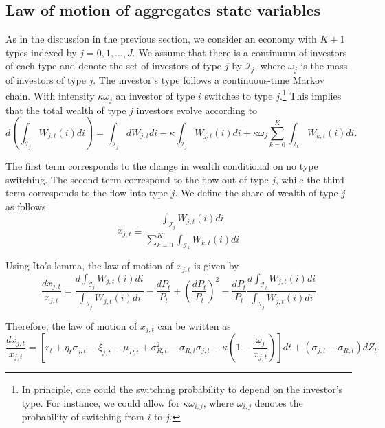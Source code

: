 \documentclass[11pt,english]{article}
\begin{document}
\subsection{Law of motion of aggregates state variables}

As in the discussion in the previous section, we consider an economy with $K+1$ types indexed by $j = 0, 1, \ldots, J$. 
We assume that there is a continuum of investors of each type and denote the set of investors of type $j$ by $\mathcal{I}_j$, where $\omega_j$ is the mass of investors of type $j$. 
The investor's type follows a continuous-time Markov chain. With intensity $\kappa \omega_{j}$ an investor of type $i$ switches to type $j$.\footnote{In principle, one could the switching probability to depend on the investor's type. For instance, we could allow for $\kappa \omega_{i,j}$, where $\omega_{i,j}$ denotes the probability of switching from $i$ to $j$.} This implies that the total wealth of type $j$ investors evolve according to
\begin{equation*}
    d \left(\int_{\mathcal{I}_j} W_{j,t}(i)di \right) =   \int_{\mathcal{I}_j} d W_{j,t} di - \kappa \int_{\mathcal{I}_j} W_{j,t}(i)di +\kappa \omega_j \sum_{k=0}^K  \int_{\mathcal{I}_k} W_{k,t}(i)di.
\end{equation*}

The first term corresponds to the change in wealth conditional on no type switching. The second term correspond to the flow out of type $j$, while the third term corresponds to the flow into type $j$. 
We define the share of wealth of type $j$ as follows
\begin{equation*}
    x_{j,t} \equiv \frac{\int_{\mathcal{I}_j} W_{j,t}(i)di}{\sum_{k=0}^K \int_{\mathcal{I}_k} W_{k,t}(i)di}
\end{equation*}

Using Ito's lemma, the law of motion of $x_{j,t}$ is given by 
\begin{equation*}
    \frac{d x_{j,t}}{x_{j,t}} = \frac{d \int_{\mathcal{I}_j} W_{j,t}(i)di }{\int_{\mathcal{I}_j} W_{j,t}(i)di } - \frac{d P_t}{P_t} + \left( \frac{d P_t}{P_t} \right)^2 -  \frac{d P_t}{P_t}  \frac{d \int_{\mathcal{I}_j} W_{j,t}(i)di}{\int_{\mathcal{I}_j} W_{j,t}(i)di}
\end{equation*}

Therefore, the law of motion of $x_{j,t}$ can be written as
\begin{equation*}
    \frac{d x_{j,t}}{x_{j,t}} = \left[ r_t + \eta_t \sigma_{j,t}  - \xi_{j,t} - \mu_{P,t} + \sigma_{R,t}^2 - \sigma_{R,t} \sigma_{j,t}  - \kappa \left( 1 - \frac{\omega_j}{x_{j,t}} \right)\right] dt + (\sigma_{j,t} - \sigma_{R,t})   d Z_t.
\end{equation*}
\end{document}
